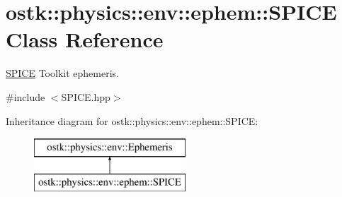 \hypertarget{classostk_1_1physics_1_1env_1_1ephem_1_1_s_p_i_c_e}{}\section{ostk\+:\+:physics\+:\+:env\+:\+:ephem\+:\+:S\+P\+I\+CE Class Reference}
\label{classostk_1_1physics_1_1env_1_1ephem_1_1_s_p_i_c_e}


\hyperlink{classostk_1_1physics_1_1env_1_1ephem_1_1_s_p_i_c_e}{S\+P\+I\+CE} Toolkit ephemeris.  




{\ttfamily \#include $<$S\+P\+I\+C\+E.\+hpp$>$}

Inheritance diagram for ostk\+:\+:physics\+:\+:env\+:\+:ephem\+:\+:S\+P\+I\+CE\+:\begin{figure}[H]
\begin{center}
\leavevmode
\includegraphics[height=2.000000cm]{classostk_1_1physics_1_1env_1_1ephem_1_1_s_p_i_c_e}
\end{center}
\end{figure}

